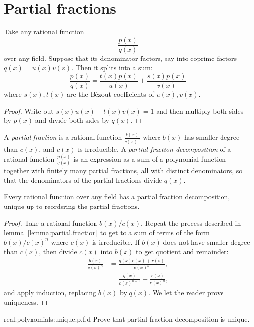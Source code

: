 \section{Partial fractions}
\begin{lemma}\label{lemma:partial.fraction}
Take any rational function 
\[
\frac{p(x)}{q(x)}
\]
over any field.
Suppose that its denominator factors, say into coprime factors \(q(x)=u(x)v(x)\).
Then it splits into a sum:
\[
\frac{p(x)}{q(x)}=\frac{t(x)p(x)}{u(x)} + \frac{s(x)p(x)}{v(x)}
\]
where \(s(x), t(x)\) are the B\'ezout coefficients of \(u(x), v(x)\).
\end{lemma}
\begin{proof}
Write out \(s(x)u(x)+t(x)v(x)=1\) and then multiply both sides by \(p(x)\) and divide both sides by \(q(x)\).
\end{proof}
A \emph{partial fraction} is a rational function \(\frac{b(x)}{c(x)^n}\) where \(b(x)\) has smaller degree than \(c(x)\), and \(c(x)\) is irreducible.
A \emph{partial fraction decomposition}
of a rational function \(\frac{p(x)}{q(x)}\) is an expression as a sum of a polynomial function together with finitely many partial fractions, all with distinct denominators, so that the denominators of the partial fractions divide \(q(x)\).
\begin{theorem}
Every rational function over any field has a partial fraction decomposition, unique up to reordering the partial fractions.
\end{theorem}
\begin{proof}
Take a rational function \(b(x)/c(x)\).
Repeat the process described in lemma~\vref{lemma:partial.fraction} to get to a sum of terms of the form \(b(x)/c(x)^n\) where \(c(x)\) is irreducible.
If \(b(x)\) does not have smaller degree than \(c(x)\), then divide \(c(x)\) into \(b(x)\) to get quotient and remainder:
\begin{align*}
\frac{b(x)}{c(x)^n}&=\frac{q(x)c(x)+r(x)}{c(x)^n},\\
&=\frac{q(x)}{c(x)^{n-1}}+\frac{r(x)}{c(x)^n},
\end{align*}
and apply induction, replacing \(b(x)\) by \(q(x)\).
We let the reader prove uniqueness.
\end{proof}
\begin{problem*}{real.polynomials:unique.p.f.d}
Prove that partial fraction decomposition is unique.
\end{problem*}
